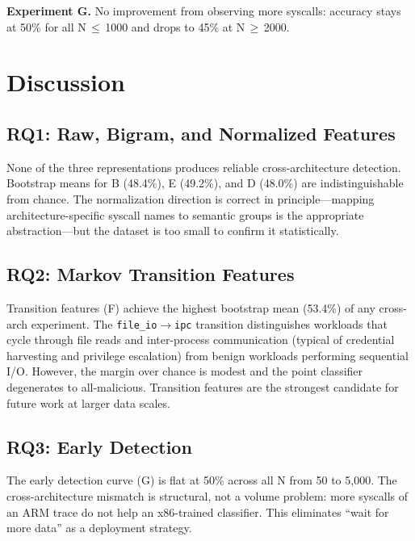 \documentclass[10pt,twocolumn]{article}
\begin{document}
\textbf{Experiment G.} No improvement from observing more syscalls: accuracy
stays at 50\% for all N\,$\leq$\,1000 and drops to 45\% at N\,$\geq$\,2000.

\section{Discussion}

\subsection{RQ1: Raw, Bigram, and Normalized Features}

None of the three representations produces reliable cross-architecture
detection. Bootstrap means for B (48.4\%), E (49.2\%), and D (48.0\%) are
indistinguishable from chance. The normalization direction is correct in
principle---mapping architecture-specific syscall names to semantic groups is
the appropriate abstraction---but the dataset is too small to confirm it
statistically.

\subsection{RQ2: Markov Transition Features}

Transition features (F) achieve the highest bootstrap mean (53.4\%) of any
cross-arch experiment. The \texttt{file\_io$\to$ipc} transition distinguishes
workloads that cycle through file reads and inter-process communication (typical
of credential harvesting and privilege escalation) from benign workloads
performing sequential I/O. However, the margin over chance is modest and the
point classifier degenerates to all-malicious. Transition features are the
strongest candidate for future work at larger data scales.

\subsection{RQ3: Early Detection}

The early detection curve (G) is flat at 50\% across all N from 50 to 5,000.
The cross-architecture mismatch is structural, not a volume problem: more
syscalls of an ARM trace do not help an x86-trained classifier. This eliminates
``wait for more data'' as a deployment strategy.
\end{document}

